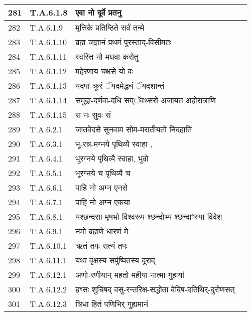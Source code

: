 \documentclass[17pt]{extarticle}
\begin{document}
\begin{longtable}{||p{0.4in}||p{0.9in}||p{4.0in}||p{0.9in}||}
        \hline
            281 & T.A.6.1.8 & एवा नो दूर्वे प्रतनु &      \\
        \hline
            282 & T.A.6.1.9 & मृत्तिके प्रतिष्ठिते सर्वं तन्मे &      \\
        \hline
            283 & T.A.6.1.10 & ब्रह्म जज्ञानं प्रथमं पुरस्ताद्{-}विसीमतः &      \\
        \hline
            284 & T.A.6.1.11 & स्वस्ति नो मघवा करोतु &      \\
        \hline
            285 & T.A.6.1.12 & महेरणाय चक्षसे यो वः &      \\
        \hline
            286 & T.A.6.1.13 & यदपां क्रूरं ॅयदमेद्ध्यं ॅयदशान्तं &      \\
        \hline
            287 & T.A.6.1.14 & समुद्रा{-}दर्णवा{-}दधि सम्ॅवथ्सरो अजायत अहोरात्राणि &      \\
        \hline
            288 & T.A.6.1.15 & स नः सुवः सं &      \\
        \hline
            289 & T.A.6.2.1 & जातवेदसे सुनवाम सोम{-}मरातीयतो निदहाति &      \\
        \hline
            290 & T.A.6.3.1 & भू{-}रन्न{-}मग्नये पृथिव्यै स्वाहा , &      \\
        \hline
            291 & T.A.6.4.1 & भूरग्नये पृथिव्यै स्वाहा, भुवो &      \\
        \hline
            292 & T.A.6.5.1 & भूरग्नये च पृथिव्यै च &      \\
        \hline
            293 & T.A.6.6.1 & पाहि नो अग्न एनसे &      \\
        \hline
            294 & T.A.6.7.1 & पाहि नो अग्न एकया &      \\
        \hline
            295 & T.A.6.8.1 & यश्छन्दसा{-}मृषभो विश्वरूप{-}श्छन्दोभ्य श्छन्दाꣳस्या विवेश &      \\
        \hline
            296 & T.A.6.9.1 & नमो ब्रह्मणे धारणं मे &      \\
        \hline
            297 & T.A.6.10.1 & ऋतं तपः सत्यं तपः &      \\
        \hline
            298 & T.A.6.11.1 & यथा वृक्षस्य सपुंष्पितस्य दूराद् &      \\
        \hline
            299 & T.A.6.12.1 & अणो{-}रणीयान् महतो महीया{-}नात्मा गुहायां &      \\
        \hline
            300 & T.A.6.12.2 & हꣳसः शुचिषद् वसु{-}रन्तरिक्ष{-}सद्धोता वेदिष{-}दतिथिर्{-}दुरोणसत् &      \\
        \hline
            301 & T.A.6.12.3 & त्रिधा हितं पणिभिर् गुह्यमानं &      \\

\end{longtable}
\end{document}
